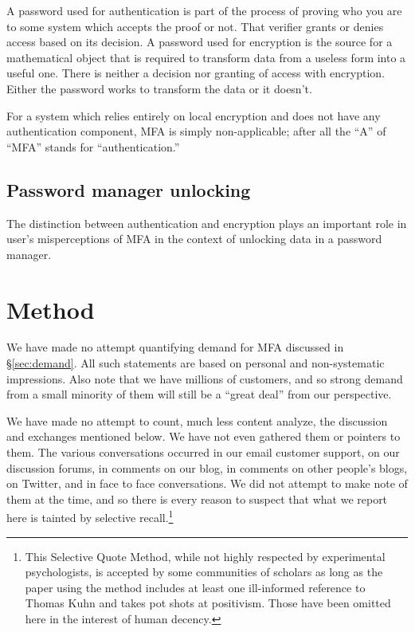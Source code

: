\documentclass{soups}
\begin{document}
A password used for authentication is part of the process of proving who you are to some system which accepts the proof or not. That verifier grants or denies access based on its decision. A password used for encryption is the source for a mathematical object that is required to transform data from a useless form into a useful one. There is neither a decision nor granting of access with encryption. Either the password works to transform the data or it doesn't.

For a system which relies entirely on local encryption and does not have any authentication component, MFA is simply non-applicable;
after all the “A” of “MFA” stands for “authentication.” 

\subsection{Password manager unlocking}

The distinction between authentication and encryption plays an important role in user's misperceptions of MFA in the context of unlocking data in a password manager. 

\section{Method}

We have made no attempt quantifying demand for MFA discussed in \S\ref{sec:demand}.
All such statements are based on personal and non-systematic impressions.
Also note that we have millions of customers,
and so strong demand from a small minority of them will still be a “great deal” from our perspective.

We have made no attempt to count, much less content analyze, the discussion and exchanges mentioned below.
We have not even gathered them or pointers to them.
The various conversations occurred in our email customer support,
on our discussion forums,
in comments on our blog,
in comments on other people's blogs,
on Twitter,
and in face to face conversations. 
We did not attempt to make note of them at the time,
and so there is every reason to suspect that what we report here is tainted by selective recall.\footnote
  {This Selective Quote Method,
  while not highly respected by experimental psychologists,
  is accepted by some communities of scholars
  as long as the paper using the method includes
  at least one ill-informed reference to Thomas Kuhn
  and takes pot shots at positivism.
  Those have been omitted here in the interest of human decency.}
\end{document}
